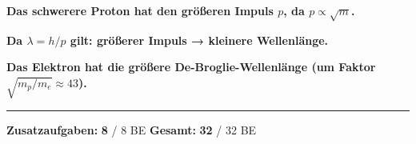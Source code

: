 \documentclass[11pt,a4paper]{article}
\newcommand{\lsg}[1]{\textcolor{loesung}{\textbf{#1}}}
\begin{document}
\vspace{0.3em}
\lsg{Das schwerere Proton hat den größeren Impuls $p$, da $p \propto \sqrt{m}$.}

\vspace{0.3em}
\lsg{Da $\lambda = h/p$ gilt: größerer Impuls → kleinere Wellenlänge.}

\vspace{0.3em}
\lsg{\textbf{Das Elektron hat die größere De-Broglie-Wellenlänge} (um Faktor $\sqrt{m_p/m_e} \approx 43$).}

\vspace{0.5em}

\begin{center}
\rule{8cm}{0.5pt}

\textbf{Zusatzaufgaben:} \lsg{8} / 8 BE \hspace{2cm} \textbf{Gesamt:} \lsg{32} / 32 BE
\end{center}
\end{document}

